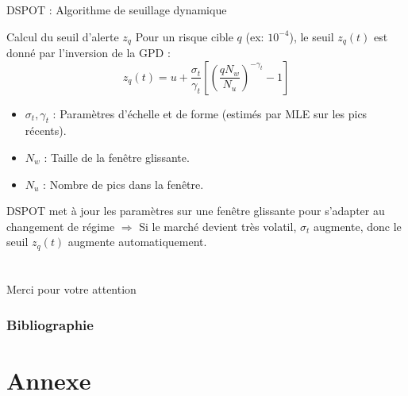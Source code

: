 \documentclass{beamer}
\begin{document}
\begin{frame}{DSPOT : Algorithme de seuillage dynamique}
    \begin{block}{Calcul du seuil d'alerte $z_q$}
        Pour un risque cible $q$ (ex: $10^{-4}$), le seuil $z_q(t)$ est donné par l'inversion de la GPD : $$ z_q(t) = u + \frac{\sigma_t}{\gamma_t} \left[ \left( \frac{q N_w}{N_u} \right)^{-\gamma_t} - 1 \right] $$
    \end{block}
    
    \begin{itemize}
        \item $\sigma_t, \gamma_t$ : Paramètres d'échelle et de forme (estimés par MLE sur les pics récents).
        \item $N_w$ : Taille de la fenêtre glissante.
        \item $N_u$ : Nombre de pics dans la fenêtre.
    \end{itemize}
    
    DSPOT met à jour les paramètres sur une fenêtre glissante pour s'adapter au changement de régime $\Rightarrow$ Si le marché devient très volatil, $\sigma_t$ augmente, donc le seuil $z_q(t)$ augmente automatiquement.
\end{frame}


\section{}
\begin{frame}{}
    \centering
    \LARGE{Merci pour votre attention}
\end{frame}


\begin{frame}[allowframebreaks]
    \frametitle{Bibliographie}
    \nocite{*}
    \printbibliography
\end{frame}


\appendix
\section{Annexe}
\end{document}
